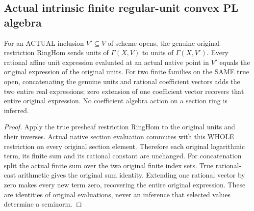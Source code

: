 \subsection{Actual intrinsic finite regular-unit convex PL algebra}

\begin{lemma}
\label{scheme:actual-native-unit-expression-algebra}
\leanok
{}
For an ACTUAL inclusion $V'\subseteq V$ of scheme opens, the genuine original
restriction RingHom sends units of $\Gamma(X,V)$ to units of
$\Gamma(X,V')$. Every rational affine unit expression evaluated at an actual
native point in $V'$ equals the original expression of the original units.
For two finite families on the SAME true open, concatenating the genuine
units and rational coefficient vectors adds the two entire real expressions;
zero extension of one coefficient vector recovers that entire original
expression. No coefficient algebra action on a section ring is inferred.
\end{lemma}
\begin{proof}
Apply the true presheaf restriction RingHom to the original units and their
inverses. Actual native section evaluation commutes with this WHOLE restriction
on every original section element. Therefore each original logarithmic term,
its finite sum and its rational constant are unchanged. For concatenation
split the actual finite sum over the two original finite index sets. True
rational-cast arithmetic gives the original sum identity. Extending one
rational vector by zero makes every new term zero, recovering the entire
original expression. These are identities of original evaluations, never an
inference that selected values determine a seminorm.
\end{proof}

